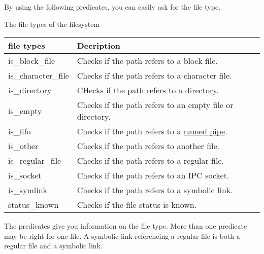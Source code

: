 By using the following predicates, you can easily ask for the file type.

\begin{center}
The file types of the filesystem
\end{center}

\begin{longtable}[c]{|l|l|}
\hline
\textbf{file types} & \textbf{Decription}                                      \\ \hline
\endfirsthead
%
\endhead
%
is\_block\_file     & Checks if the path refers to a block file.               \\ \hline
is\_character\_file & Checks if the path refers to a character file.           \\ \hline
is\_directory       & CHecks if the path refers to a directory.                \\ \hline
is\_empty           & Checks if the path refers to an empty file or directory. \\ \hline
is\_fifo            & Checks if the path refers to a \href{https://en.wikipedia.org/wiki/Named_pipe}{named pipe}.               \\ \hline
is\_other           & Checks if the path refers to another file.               \\ \hline
is\_regular\_file   & Checks if the path refers to a regular file.             \\ \hline
is\_socket          & Checks if the path refers to an IPC socket.              \\ \hline
is\_symlink         & Checks if the path refers to a symbolic link.            \\ \hline
status\_known       & Checks if the file status is known.                      \\ \hline
\end{longtable}


The predicates give you information on the file type. More than one predicate may be right for one file. A symbolic link referencing a regular file is both a regular file and a symbolic link.


